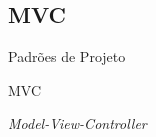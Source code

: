 \documentclass[
	9pt, %
	t, %
]{beamer}
\begin{document}

\subsection{MVC}

\begin{frame}
	\begin{center}
		
		\bigskip\bigskip\bigskip\bigskip %
		{\Large Padrões de Projeto}
		
		\bigskip\bigskip %
		{\Huge MVC}
		
		\smallskip
		{\small \textit{Model-View-Controller}}
	\end{center}

\end{frame}
\end{document}
